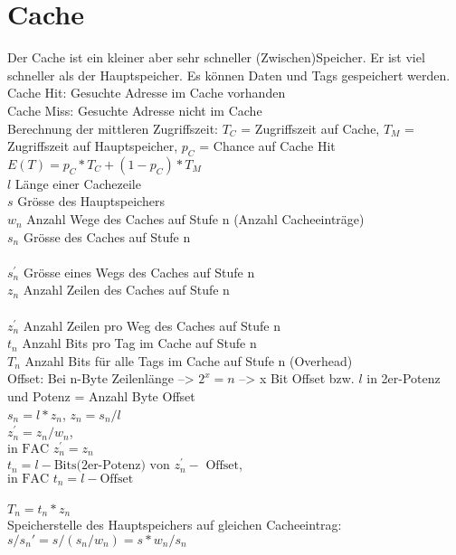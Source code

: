 \section{Cache}
Der Cache ist ein kleiner aber sehr schneller (Zwischen)Speicher. Er ist viel schneller als der Hauptspeicher. Es können Daten und Tags gespeichert werden.\\
\textcolor{myblue}{Cache Hit}: Gesuchte Adresse im Cache vorhanden\\
\textcolor{myblue}{Cache Miss}: Gesuchte Adresse nicht im Cache\\
\textcolor{myblue}{Berechnung der mittleren Zugriffszeit}: $T_C$ = Zugriffszeit auf Cache, $T_M$ = Zugriffszeit auf Hauptspeicher, $p_C$ = Chance auf Cache Hit\\
$E(T)=p_C*T_C+(1-p_C)*T_M$\\
$l$ Länge einer Cachezeile\\
$s$ Grösse des Hauptspeichers\\
$w_n$ Anzahl Wege des Caches auf Stufe n (Anzahl Cacheeinträge)\\
$s_n$ Grösse des Caches auf Stufe n\\\\
$s^{'}_n$ Grösse eines Wegs des Caches auf Stufe n\\
$z_n$ Anzahl Zeilen des Caches auf Stufe n\\\\
$z_n^{'}$ Anzahl Zeilen pro Weg des Caches auf Stufe n\\
$t_n$ Anzahl Bits pro Tag im Cache auf Stufe n\\
$T_n$ Anzahl Bits für alle Tags im Cache auf Stufe n (Overhead)\\
\textcolor{myblue}{Offset}: Bei n-Byte Zeilenlänge --> $2^x = n$ --> x Bit Offset bzw. $l$ in 2er-Potenz und Potenz = Anzahl Byte Offset\\
$s_n = l * z_n$, $z_n = s_n/l$\\
$z_n^{'} = z_n /w_n$,\\
$\text{in FAC } z_n^{'} = z_n$\\
$t_n = l - \text{Bits(2er-Potenz) von } z_n^{'} - \text{ Offset}$,\\
$\text{in FAC }t_n = l - \text{Offset}$\\\\
$T_n = t_n * z_n$\\
\textcolor{myblue}{Speicherstelle des Hauptspeichers auf gleichen Cacheeintrag}: $s/s_n{'} = s/(s_n /w_n ) = s * w_n /s_n$\\
